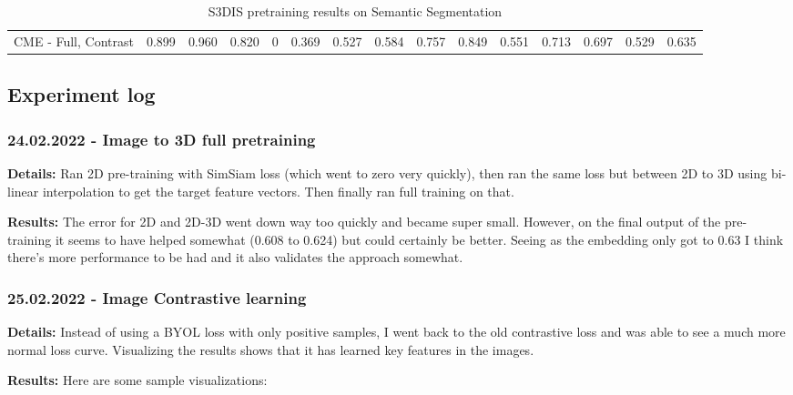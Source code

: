\documentclass[12pt]{article}
\begin{document}
\begin{center}
\begin{table}[h!]
{\begin{tabular}{ c | c c c c c c c c c c c c c | c }
                CME - Full, Contrast                            & 0.899          & 0.960          & 0.820          & 0              & 0.369          & 0.527          & 0.584          & 0.757          & 0.849          & 0.551          & 0.713          & 0.697          & 0.529          & 0.635          \\
            \end{tabular}
        }
        \caption{S3DIS pretraining results on Semantic Segmentation}
    \end{table}
\end{center}

\subsection{Experiment log}

\subsubsection{24.02.2022 - Image to 3D full pretraining}

\textbf{Details:} Ran 2D pre-training with SimSiam loss (which went to zero very quickly), then ran the same loss but between 2D to 3D using bi-linear interpolation to get the target feature vectors. Then finally ran full training on that.

\textbf{Results:} The error for 2D and 2D-3D went down way too quickly and became super small. However, on the final output of the pre-training it seems to have helped somewhat (0.608 to 0.624) but could certainly be better. Seeing as the embedding only got to 0.63 I think there's more performance to be had and it also validates the approach somewhat.

\subsubsection{25.02.2022 - Image Contrastive learning}

\textbf{Details:} Instead of using a BYOL loss with only positive samples, I went back to the old contrastive loss and was able to see a much more normal loss curve. Visualizing the results shows that it has learned key features in the images.

\textbf{Results:} Here are some sample visualizations:
\end{document}
